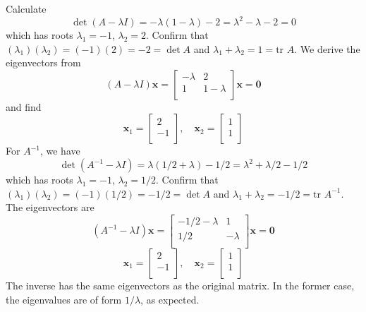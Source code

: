 \documentclass[a4paper]{article}
\begin{document}
Calculate
\[
	\det \!\left( A - \lambda I \right) = -\lambda \!\left( 1 - \lambda  \right) - 2 = \lambda^{2} - \lambda - 2 = 0
\]
which has roots \(\lambda_{1} = -1\), \(\lambda_{2} = 2\). Confirm that \(\!\left( \lambda_{1} \right) \!\left( \lambda_{2} \right) = \!\left( -1 \right) \!\left( 2 \right) = -2 = \det A\) and \(\lambda_{1} + \lambda_{2} = 1 = \text{tr }A\). We derive the eigenvectors from
\[
	\!\left( A - \lambda I \right) \bm{x} = 
	\begin{bmatrix}
		-\lambda  & 2 \\
		1 & 1 - \lambda  \\
	\end{bmatrix}
	\bm{x} = \bm{0}
\]
and find
\[
	\bm{x}_{1} =
	\begin{bmatrix}
		2 \\
		-1 \\
	\end{bmatrix},
	\quad
	\bm{x}_{2} =
	\begin{bmatrix}
		1 \\
		1 \\
	\end{bmatrix}
\]
For \(A^{-1}\), we have
\[
	\det \!\left( A^{-1} - \lambda I \right) = \lambda \!\left(1/2 + \lambda   \right) - 1/2 = \lambda^{2} + \lambda/2 - 1/2 
\]
which has roots \(\lambda_{1} = -1\), \(\lambda_{2} = 1/2\). Confirm that \(\!\left( \lambda_{1} \right) \!\left( \lambda_{2} \right) = \!\left( -1 \right) \!\left( 1/2 \right) = -1/2 = \det A\) and \(\lambda_{1} + \lambda_{2} = -1/2 = \text{tr }A^{-1}\). The eigenvectors are
\[
	\!\left( A^{-1} - \lambda I \right) \bm{x} = 
	\begin{bmatrix}
		-1/2 - \lambda  & 1 \\
		1/2 & -\lambda  \\
	\end{bmatrix}
	\bm{x} = \bm{0}
\]
\[
	\bm{x}_{1} = 
	\begin{bmatrix}
		2 \\
		-1 \\
	\end{bmatrix},
	\quad
	\bm{x}_{2} =
	\begin{bmatrix}
		1 \\
		1 \\
	\end{bmatrix}
\]
The inverse has the same eigenvectors as the original matrix. In the former case, the eigenvalues are of form \(1/\lambda \), as expected.

\vspace{12pt}
\end{document}
